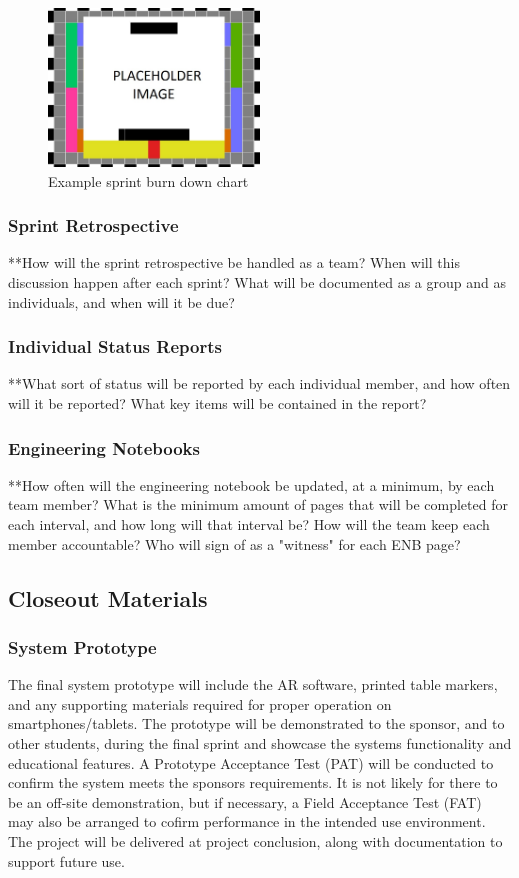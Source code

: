 \begin{figure}[h!]
    \centering
    \includegraphics[width=0.5\textwidth]{images/test_image}
    \caption{Example sprint burn down chart}
\end{figure}

\subsubsection{Sprint Retrospective}
**How will the sprint retrospective be handled as a team? When will this discussion happen after each sprint? What will be documented as a group and as individuals, and when will it be due?

\subsubsection{Individual Status Reports}
**What sort of status will be reported by each individual member, and how often will it be reported? What key items will be contained in the report?

\subsubsection{Engineering Notebooks}
**How often will the engineering notebook be updated, at a minimum, by each team member? What is the minimum amount of pages that will be completed for each interval, and how long will that interval be? How will the team keep each member accountable? Who will sign of as a "witness" for each ENB page?

\subsection{Closeout Materials}

\subsubsection{System Prototype}
The final system prototype will include the AR software, printed table markers, and any supporting materials required for proper operation on smartphones/tablets. The prototype will be demonstrated to the sponsor, and to other students, during the final sprint and showcase the systems functionality and educational features. A Prototype Acceptance Test (PAT) will be conducted to confirm the system meets the sponsors requirements. It is not likely for there to be an off-site demonstration, but if necessary, a Field Acceptance Test (FAT) may also be arranged to cofirm performance in the intended use environment. The project will be delivered at project conclusion, along with documentation to support future use.

